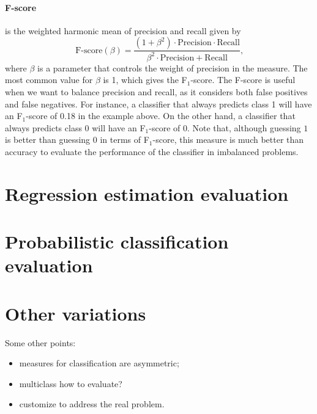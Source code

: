 \paragraph{F-score} is the weighted harmonic mean of precision and recall given by
\begin{equation*}
  \text{F-score}(\beta) =
    \frac%
      {(1 + \beta^2) \cdot \text{Precision} \cdot \text{Recall}}
      {\beta^2 \cdot \text{Precision} + \text{Recall}}\text{,}
\end{equation*}
where $\beta$ is a parameter that controls the weight of precision in the measure.  The
most common value for $\beta$ is 1, which gives the F$_1$-score.  The F-score is useful
when we want to balance precision and recall, as it considers both false positives and
false negatives.  For instance, a classifier that always predicts class 1 will have an
F$_1$-score of 0.18 in the example above.  On the other hand, a classifier that always
predicts class 0 will have an F$_1$-score of 0.  Note that, although guessing $1$ is
better than guessing $0$ in terms of F$_1$-score, this measure is much better than
accuracy to evaluate the performance of the classifier in imbalanced problems.

\section{Regression estimation evaluation}


\section{Probabilistic classification evaluation}

\section{Other variations}

Some other points:
\begin{itemize}
  \item measures for classification are asymmetric;
  \item multiclass how to evaluate?
  \item customize to address the real problem.
\end{itemize}
